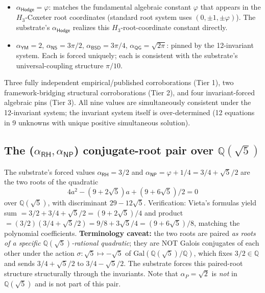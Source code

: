 \documentclass[11pt,a4paper]{amsart}
\theoremstyle{plain}
\theoremstyle{definition}
\begin{document}
\begin{description}[font=\normalfont\bfseries,leftmargin=2em,itemsep=4pt]
\begin{itemize}[itemsep=2pt,leftmargin=2em]
\item $\alpha_{\textsf{Hodge}} = \varphi$: matches the fundamental algebraic constant $\varphi$ that appears in the $H_3$-Coxeter root coordinates (standard root system uses $(0, \pm 1, \pm \varphi)$). The substrate's $\alpha_{\textsf{Hodge}}$ realizes this $H_3$-root-coordinate constant directly.
\end{itemize}
\item[Tier 3 --- Algebraically forced by the invariant system.]
\begin{itemize}[itemsep=2pt,leftmargin=2em]
\item $\alpha_{\textsf{YM}} = 2$, $\alpha_{\textsf{NS}} = 3\pi/2$, $\alpha_{\textsf{BSD}} = 3\pi/4$, $\alpha_{\textsf{QG}} = \sqrt{2\pi}$: pinned by the 12-invariant system. Each is forced uniquely; each is consistent with the substrate's universal-coupling structure $\pi/10$.
\end{itemize}
\end{description}

Three fully independent empirical/published corroborations (Tier 1), two framework-bridging structural corroborations (Tier 2), and four invariant-forced algebraic pins (Tier 3). All nine values are simultaneously consistent under the 12-invariant system; the invariant system itself is over-determined (12 equations in 9 unknowns with unique positive simultaneous solution).

\subsection{The (\texorpdfstring{$\alpha_{\textsf{RH}}, \alpha_{\textsf{NP}}$}{alpha\_RH, alpha\_NP}) conjugate-root pair over \texorpdfstring{$\mathbb{Q}(\sqrt{5})$}{Q(sqrt(5))}}\label{subsec:galois-pair-corrected}

The substrate's forced values $\alpha_{\textsf{RH}} = 3/2$ and $\alpha_{\textsf{NP}} = \varphi + 1/4 = 3/4 + \sqrt{5}/2$ are the two roots of the quadratic
\[
4a^2 - (9 + 2\sqrt{5})a + (9 + 6\sqrt{5})/2 = 0
\]
over $\mathbb{Q}(\sqrt{5})$, with discriminant $29 - 12\sqrt{5}$. Verification: Vieta's formulas yield sum $= 3/2 + 3/4 + \sqrt{5}/2 = (9 + 2\sqrt{5})/4$ and product $= (3/2)(3/4 + \sqrt{5}/2) = 9/8 + 3\sqrt{5}/4 = (9 + 6\sqrt{5})/8$, matching the polynomial coefficients. \textbf{Terminology caveat:} the two roots are paired \emph{as roots of a specific $\mathbb{Q}(\sqrt{5})$-rational quadratic}; they are NOT Galois conjugates of each other under the action $\sigma: \sqrt{5} \mapsto -\sqrt{5}$ of $\mathrm{Gal}(\mathbb{Q}(\sqrt{5})/\mathbb{Q})$, which fixes $3/2 \in \mathbb{Q}$ and sends $3/4 + \sqrt{5}/2$ to $3/4 - \sqrt{5}/2$. The substrate forces this paired-root structure structurally through the invariants. Note that $\alpha_{P} = \sqrt{2}$ is \emph{not} in $\mathbb{Q}(\sqrt{5})$ and is not part of this pair.
\end{document}
